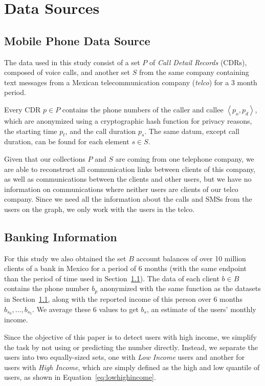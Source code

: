 \section{Data Sources}
\label{sec:data_sources}

\subsection{Mobile Phone Data Source}
\label{subsec:telcoinformation}

The data used in this study consist of a set $P$ of \textit{Call Detail Records} (CDRs), composed of voice calls, and another set $S$ from the same company containing text messages from a Mexican telecommunication company (\textit{telco}) for a 3 month period.

Every CDR $p \in P$ contains the phone numbers of the caller and callee $\left< p_o, p_d \right>$, which are anonymized using a cryptographic hash function for privacy reasons, the starting time \( p_t \), and the call duration \( p_s \). The same datum, except call duration, can be found for each element $s \in S$.

Given that our collections $P$ and $S$ are coming from one telephone company, we are able to reconstruct all communication links between clients of this company, as well as communications between the clients and other users, but we have no information on communications where neither users are clients of our telco company. Since we need all the information about the calls and SMSs from the users on the graph, we only work with the users in the telco.

\subsection{Banking Information}

For this study we also obtained the set $B$ account balances of over 10 million clients of a bank in Mexico for a period of 6 months (with the same endpoint than the period of time used in Section~\ref{subsec:telcoinformation}). The data of each client $b \in B$ contains the phone number $b_p$ anonymized with the same function as the datasets in Section~\ref{subsec:telcoinformation}, along with the reported income of this person over 6 months $b_{s_0}, \ldots, b_{s_5}$. We average these 6 values to get $b_s$, an estimate of the users' monthly income.

Since the objective of this paper is to detect users with high income, we simplify the task by not using or predicting the number directly. Instead, we separate the users into two equally-sized sets, one with \emph{Low Income} users and another for users with \emph{High Income}, which are simply defined as the high and low quantile of users, as shown in Equation~\ref{eq:lowhighincome}.

